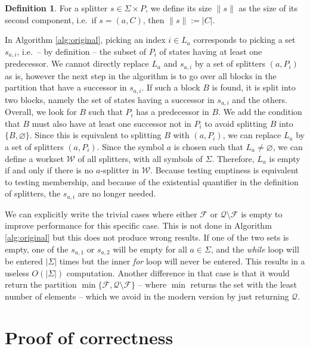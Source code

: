 \documentclass[12pt, a4 paper]{article}
\theoremstyle{definition}
\newtheorem{definition}{Definition}
\begin{document}
\begin{definition}
    For a splitter $s \in \Sigma \times P$, we define its size $\| s \|$ as the size of its second component, i.e.\ if $s = (a, C)$, then $\| s \| := |C|$.
\end{definition}


In Algorithm \ref{alg:original}, picking an index $i \in L_a$ corresponds to picking a set $s_{a, i}$, i.e.\ -- by definition -- the subset of $P_i$ of states having at least one predecessor.
We cannot directly replace $L_a$ and $s_{a, i}$ by a set of splitters $(a, P_i)$ as is, however the next step in the algorithm is to go over all blocks in the partition that have a successor in $s_{a, i}$.
If such a block $B$ is found, it is split into two blocks, namely the set of states having a successor in $s_{a, i}$ and the others.
Overall, we look for $B$ such that $P_i$ has a predecessor in $B$. We add the condition that $B$ must also have at least one successor not in $P_i$ to avoid splitting $B$ into $\{B, \varnothing\}$.
Since this is equivalent to splitting $B$ with $(a, P_i)$, we can replace $L_a$ by a set of splitters $(a, P_i)$.
Since the symbol $a$ is chosen such that $L_a \neq \varnothing$, we can define a workset $\mathcal{W}$ of all splitters, with all symbols of $\Sigma$. Therefore, $L_a$ is empty if and only if there is no $a$-splitter in $\mathcal{W}$.
Because testing emptiness is equivalent to testing membership, and because of the existential quantifier in the definition of splitters, the $s_{a, i}$ are no longer needed.

We can explicitly write the trivial cases where either $\mathcal{F}$ or $\mathcal{Q}\setminus\mathcal{F}$ is empty to improve performance for this specific case.
This is not done in Algorithm \ref{alg:original} but this does not produce wrong results.
If one of the two sets is empty, one of the $s_{a, 1}$ or $s_{a, 2}$ will be empty for all $a \in \Sigma$, and the \textit{while} loop will be entered $|\Sigma|$ times but the inner \textit{for} loop will never be entered.
This results in a useless $O(|\Sigma|)$ computation.
Another difference in that case is that it would return the partition $\min\{\mathcal{F}, \mathcal{Q}\setminus\mathcal{F}\}$ -- where $\min$ returns the set with the least number of elements --  which we avoid in the modern version by just returning $\mathcal{Q}$.

\section{Proof of correctness}
\end{document}
